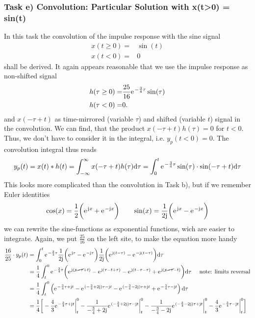 \documentclass[11pt,a4paper,DIV=12]{scrartcl}
\begin{document}
\subsubsection{Task e) Convolution: Particular Solution with x(t>0) = sin(t)}
%
In this task the convolution of the impulse response with the sine signal
\begin{align}
x(t \geq 0) =& \sin(t)\\
x(t<0) =& 0
\end{align}
shall be derived.
%
It again appears reasonable that we use the impulse response as non-shifted signal
\begin{align}
h(\tau\geq 0) =& \frac{25}{16} \e^{-\frac{3}{4} \tau} \sin(\tau)\\
h(\tau < 0) =& 0.
\end{align}
and $x(-\tau + t)$ as time-mirrored (variable $\tau$) and shifted (variable $t$)
signal in the convolution.
%
We can find, that the product $x(-\tau + t) h(\tau)= 0$ for $t<0$.
Thus, we don't have to consider it in the integral, i.e. $y_p(t<0)=0$.
%
The convolution integral thus reads
\begin{align}
	y_p(t) =x(t) \ast h(t) = \int_{-\infty}^{\infty}x(-\tau+t) h(\tau)\mathrm{d}\tau=
	\int_0^t \e^{-\frac{3}{4}\tau}\sin(\tau)\cdot\sin(-\tau+t)\mathrm{d}\tau \nonumber
\end{align}
This looks more complicated than the convolution in Task b), but if we remember Euler identities
\begin{align}
	\cos(x)=\frac{1}{2}\bigg (\e^{\im x}+\e^{-\im x} \bigg ) \qquad
	\sin(x)=\frac{1}{2\im}\bigg (\e^{\im x}-\e^{-\im x}\bigg )
\end{align}
we can rewrite the sine-functions as exponential functions,
wich are easier to integrate.
%
Again, we put $\frac{25}{16}$ on the left site, to make the equation more handy
\begin{align}
	\label{eq:sinConvolutionA}
	\frac{16}{25}\cdot y_p(t)&=\int_0^t \e^{-\frac{3}{4}\tau}\frac{1}{2\im}\bigg(\e^{\im\tau}-\e^{-\im\tau}\bigg)\frac{1}{2\im}\bigg(\e^{\im(t-\tau)}-\e^{-\im(t-\tau)}\bigg)\mathrm{d}\tau \nonumber \\
	&=\frac{1}{4}\int_t^0 \e^{-\frac{3}{4}\tau}\bigg(\e^{\im(\cancel {\tau-\tau}+t)}-\e^{\im(\tau-t+\tau)}-\e^{\im(t-\tau-\tau)}+\e^{\im(\cancel {\tau-\tau}-t)}\bigg)\mathrm{d}\tau \quad\text{ note: limits reversal} \nonumber \\
	&=\frac{1}{4}\int_t^0 \left(\e^{-\frac{3}{4}\tau +\im t}-\e^{(-\frac{3}{4}+2\im)\tau-\im t}-\e^{(-\frac{3}{4}-2\im)\tau+\im t}+\e^{-\frac{3}{4}\tau-\im t}\right)\mathrm{d}\tau \nonumber \\
	&=\frac{1}{4}\bigg[-\frac{4}{3}\e^{-\frac{3}{4}\tau+\im t}\bigg|_t^0 -\frac{1}{-\frac{3}{4}+2\im}\e^{(-\frac{3}{4}+2\im)\tau-\im t}\bigg |_t^0-\frac{1}{-\frac{3}{4}-2\im}\e^{(-\frac{3}{4}-2\im)\tau+\im t}\bigg |_t^0-\frac{4}{3}\e^{-\frac{3}{4}\tau-\im t}\bigg |_t^0\bigg ]
\end{align}
\end{document}
